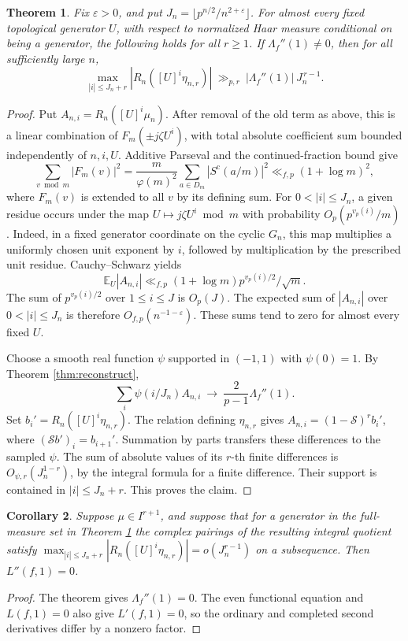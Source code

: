 \documentclass[11pt]{article}
\newtheorem{theorem}{Theorem}[section]
\newtheorem{corollary}[theorem]{Corollary}
\begin{document}
\begin{theorem}\label{thm:growth}
Fix \(\varepsilon>0\), and put
\(J_n=\lfloor p^{n/2}/n^{2+\varepsilon}\rfloor\).
For almost every fixed topological generator \(U\), with respect to
normalized Haar measure conditional on being a generator, the following
holds for all \(r\ge1\). If \(\Lambda_f''(1)\ne0\), then for all
sufficiently large \(n\),
\[
 \max_{|i|\le J_n+r}
      |R_n([U]^i\eta_{n,r})|
    \ \gg_{p,r}\ |\Lambda_f''(1)|\,J_n^{\,r-1}.
\]
\end{theorem}

\begin{proof}
Put \(A_{n,i}=R_n([U]^i\mu_n)\). After removal of the old term as
above, this is a linear combination of
\(F_m(\pm j\zeta U^i)\), with total absolute coefficient sum bounded
independently of \(n,i,U\). Additive Parseval and the continued-fraction
bound give
\[
 \sum_{v\bmod m}|F_m(v)|^2
   =\frac{m}{\varphi(m)^2}\sum_{a\in D_m}|S^{\mathrm c}(a/m)|^2
   \ll_{f,p}(1+\log m)^2,
\]
where \(F_m(v)\) is extended to all \(v\) by its defining sum.
For \(0<|i|\le J_n\), a given residue occurs under the map
\(U\mapsto j\zeta U^i\bmod m\) with probability
\(O_p(p^{v_p(i)}/m)\). Indeed, in a fixed generator coordinate on the
cyclic \(G_n\), this map multiplies a uniformly chosen unit exponent
by \(i\), followed by multiplication by the prescribed unit residue.
Cauchy--Schwarz yields
\[
 \mathbb E_U |A_{n,i}|
  \ll_{f,p} (1+\log m) p^{v_p(i)/2}/\sqrt m .
\]
The sum of \(p^{v_p(i)/2}\) over \(1\le i\le J\) is \(O_p(J)\).
The expected sum of \(|A_{n,i}|\) over \(0<|i|\le J_n\) is
therefore \(O_{f,p}(n^{-1-\varepsilon})\). These sums tend to
zero for almost every fixed \(U\).

Choose a smooth real function \(\psi\) supported in \((-1,1)\) with
\(\psi(0)=1\). By Theorem \ref{thm:reconstruct},
\[
 \sum_i \psi(i/J_n) A_{n,i}\ \longrightarrow\
          \frac{2}{p-1}\Lambda_f''(1).
\]
Set \(b_i'=R_n([U]^i\eta_{n,r})\). The relation defining \(\eta_{n,r}\)
gives \(A_{n,i}=(1-\mathcal S)^rb_i'\), where
\((\mathcal S b')_i=b_{i+1}'\). Summation by parts transfers these
differences to the sampled \(\psi\). The sum of absolute values of
its \(r\)-th finite differences is \(O_{\psi,r}(J_n^{1-r})\), by the
integral formula for a finite difference. Their support is contained
in \(|i|\le J_n+r\). This proves the claim.
\end{proof}

\begin{corollary}
Suppose \(\mu\in I^{r+1}\), and suppose that for a generator in the
full-measure set in Theorem \ref{thm:growth} the complex pairings of
the resulting integral quotient satisfy
\(\max_{|i|\le J_n+r}|R_n([U]^i\eta_{n,r})|=o(J_n^{r-1})\) on a
subsequence. Then \(L''(f,1)=0\).
\end{corollary}
\begin{proof}
The theorem gives \(\Lambda_f''(1)=0\). The even functional equation
and \(L(f,1)=0\) also give \(L'(f,1)=0\), so the ordinary and
completed second derivatives differ by a nonzero factor.
\end{proof}
\end{document}
